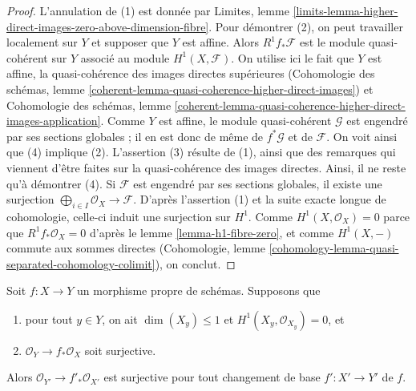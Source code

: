 \begin{proof}
L'annulation de (1) est donnée par Limites, lemme
\ref{limits-lemma-higher-direct-images-zero-above-dimension-fibre}.
Pour démontrer (2), on peut travailler localement sur $Y$ et supposer que $Y$ est affine.
Alors $R^1f_*\mathcal{F}$ est le module quasi-cohérent sur $Y$
associé au module $H^1(X, \mathcal{F})$.
On utilise ici le fait que $Y$ est affine, la quasi-cohérence des images directes
supérieures (Cohomologie des schémas, lemme
\ref{coherent-lemma-quasi-coherence-higher-direct-images}) et
Cohomologie des schémas, lemme
\ref{coherent-lemma-quasi-coherence-higher-direct-images-application}.
Comme $Y$ est affine, le module quasi-cohérent $\mathcal{G}$
est engendré par ses sections globales ; il en est donc de même de $f^*\mathcal{G}$
et de $\mathcal{F}$.
On voit ainsi que (4) implique (2).
L'assertion (3) résulte de (1), ainsi que des remarques qui viennent d'être faites
sur la quasi-cohérence des images directes. Ainsi,
il ne reste qu'à démontrer (4).
Si $\mathcal{F}$ est engendré par ses sections globales, il existe une surjection
$\bigoplus_{i \in I} \mathcal{O}_X \to \mathcal{F}$. D'après l'assertion (1)
et la suite exacte longue de cohomologie, celle-ci
induit une surjection sur $H^1$. Comme $H^1(X, \mathcal{O}_X) = 0$
parce que $R^1f_*\mathcal{O}_X = 0$ d'après le
lemme \ref{lemma-h1-fibre-zero}, et
comme $H^1(X, -)$ commute aux sommes directes
(Cohomologie, lemme \ref{cohomology-lemma-quasi-separated-cohomology-colimit}),
on conclut.
\end{proof}

\begin{lemma}
\label{lemma-h1-fibre-zero-check-h0-kappa}
Soit $f : X \to Y$ un morphisme propre de schémas. Supposons que
\begin{enumerate}
\item pour tout $y \in Y$, on ait $\dim(X_y) \leq 1$ et
$H^1(X_y, \mathcal{O}_{X_y}) = 0$, et
\item $\mathcal{O}_Y \to f_*\mathcal{O}_X$ soit surjective.
\end{enumerate}
Alors $\mathcal{O}_{Y'} \to f'_*\mathcal{O}_{X'}$ est surjective
pour tout changement de base $f' : X' \to Y'$ de $f$.
\end{lemma}

